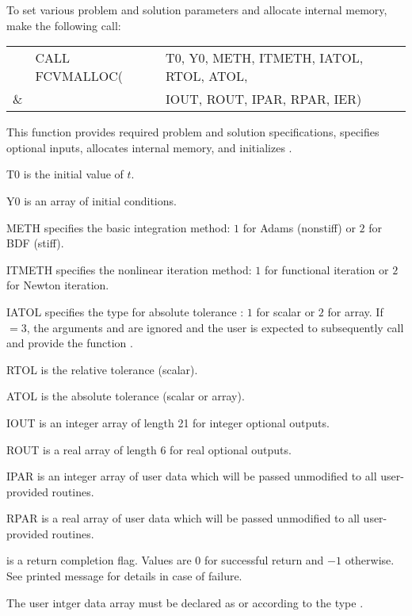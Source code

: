 \begin{Steps}
  To set various problem and solution parameters and allocate
  internal memory, make the following call:
  {
    \begin{tabular}[t]{@{}r@{}l@{}l}
        &CALL FCVMALLOC(&T0, Y0, METH, ITMETH, IATOL, RTOL, ATOL, \\
    {\&}&               &IOUT, ROUT, IPAR, RPAR, IER)
    \end{tabular}
  }
  {
    This function provides required problem and solution specifications, 
    specifies optional inputs,
    allocates internal memory, and initializes {\cvode}.
  }
  {
    \begin{args}[ITMETH]
    \item[T0] is the initial value of $t$.
    \item[Y0] is an array of initial conditions.
    \item[METH] specifies the  basic integration method: 
      $1$ for Adams (nonstiff) or $2$ for BDF (stiff).
    \item[ITMETH] specifies the nonlinear iteration method: 
      $1$ for functional iteration or $2$ for Newton iteration.
    \item[IATOL] specifies the type for absolute tolerance :
      $1$ for scalar or $2$ for array. If $=3$, the arguments
       and  are ignored and the user is expected to
      subsequently call  and provide the function .
    \item[RTOL] is the relative tolerance (scalar).
    \item[ATOL] is the absolute tolerance (scalar or array).
    \item[IOUT] is an integer array of length 21 for integer optional outputs.
    \item[ROUT] is a real array of length 6 for real optional outputs.
    \item[IPAR] is an integer array of user data which will be passed
      unmodified to all user-provided routines.
    \item[RPAR] is a real array of user data which will be passed
      unmodified to all user-provided routines.
    \end{args}
  }
  {
     is a return completion flag.  Values are $0$ for successful return
    and $-1$ otherwise. See printed message for details in case of failure.
  }
  {
    The user intger data array  must be declared as  or 
     according to the {\C} type .

}
\end{Steps}
